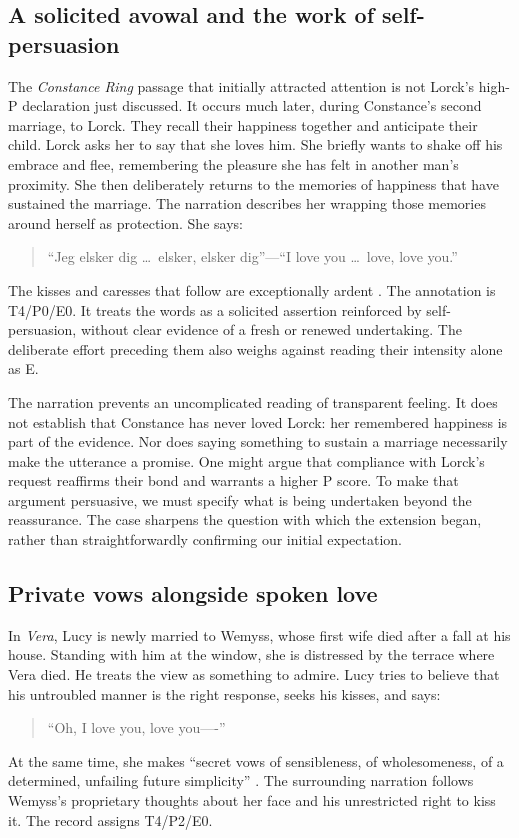 \documentclass[11pt,a4paper]{article}
\begin{document}
\subsection{A solicited avowal and the work of self-persuasion}

The \emph{Constance Ring} passage that initially attracted attention is not Lorck's high-P declaration just discussed. It occurs much later, during Constance's second marriage, to Lorck. They recall their happiness together and anticipate their child. Lorck asks her to say that she loves him. She briefly wants to shake off his embrace and flee, remembering the pleasure she has felt in another man's proximity. She then deliberately returns to the memories of happiness that have sustained the marriage. The narration describes her wrapping those memories around herself as protection. She says:
\begin{quote}
“Jeg elsker dig \ldots\ elsker, elsker dig”---“I love you \ldots\ love, love you.”
\end{quote}
The kisses and caresses that follow are exceptionally ardent \citep[chap.~XXIV, pp.~369--370]{skramConstance}. The annotation is T4/P0/E0. It treats the words as a solicited assertion reinforced by self-persuasion, without clear evidence of a fresh or renewed undertaking. The deliberate effort preceding them also weighs against reading their intensity alone as E.

The narration prevents an uncomplicated reading of transparent feeling. It does not establish that Constance has never loved Lorck: her remembered happiness is part of the evidence. Nor does saying something to sustain a marriage necessarily make the utterance a promise. One might argue that compliance with Lorck's request reaffirms their bond and warrants a higher P score. To make that argument persuasive, we must specify what is being undertaken beyond the reassurance. The case sharpens the question with which the extension began, rather than straightforwardly confirming our initial expectation.

\subsection{Private vows alongside spoken love}

In \emph{Vera}, Lucy is newly married to Wemyss, whose first wife died after a fall at his house. Standing with him at the window, she is distressed by the terrace where Vera died. He treats the view as something to admire. Lucy tries to believe that his untroubled manner is the right response, seeks his kisses, and says:
\begin{quote}
“Oh, I love you, love you----”
\end{quote}
At the same time, she makes “secret vows of sensibleness, of wholesomeness, of a determined, unfailing future simplicity” \citep[chap.~XVII]{vonArnimVera}. The surrounding narration follows Wemyss's proprietary thoughts about her face and his unrestricted right to kiss it. The record assigns T4/P2/E0.
\end{document}
